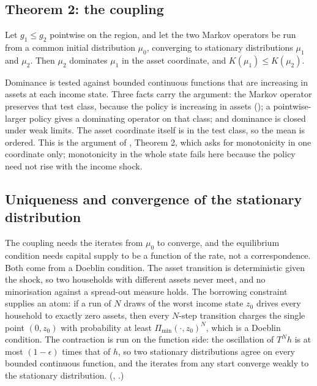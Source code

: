 \subsection{Theorem 2: the coupling}\label{sec:coupling}

\begin{proposition}
Let $g_1\le g_2$ pointwise on the region, and let the two Markov operators be run from a common
initial distribution $\mu_0$, converging to stationary distributions $\mu_1$ and $\mu_2$. Then
$\mu_2$ dominates $\mu_1$ in the asset coordinate, and $K(\mu_1)\le K(\mu_2)$.
\end{proposition}

Dominance is tested against bounded continuous functions that are increasing in assets at each
income state. Three facts carry the argument: the Markov operator preserves that test class, because
the policy is increasing in assets (); a pointwise-larger policy gives a
dominating operator on that class; and dominance is closed under weak limits. The asset coordinate
itself is in the test class, so the mean is ordered. This is the argument of \citet{Light2022},
Theorem 2, which asks for monotonicity in one coordinate only; monotonicity in the whole state
fails here because the policy need not rise with the income shock.

\subsection{Uniqueness and convergence of the stationary distribution}\label{sec:doeblin}

The coupling needs the iterates from $\mu_0$ to converge, and the equilibrium condition needs
capital supply to be a function of the rate, not a correspondence. Both come from a Doeblin
condition. The asset transition is deterministic given the shock, so two households with different
assets never meet, and no minorisation against a spread-out measure holds. The borrowing constraint
supplies an atom: if a run of $N$ draws of the worst income state $z_0$ drives every household to
exactly zero assets, then every $N$-step transition charges the single point $(0,z_0)$ with
probability at least $\Pi_{\min}(\cdot,z_0)^N$, which is a Doeblin condition. The contraction is run
on the function side: the oscillation of $T^N h$ is at most $(1-\epsilon)$ times that of $h$, so
two stationary distributions agree on every bounded continuous function, and the iterates from any
start converge weakly to the stationary distribution.
(, .)

